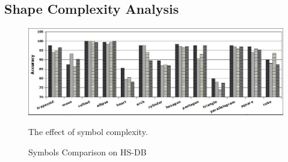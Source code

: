 \documentclass{article}
\begin{document}
\subsection{Shape Complexity Analysis}
\label{sec:ShapeComplexityExperiments}

\begin{figure}
	\centering
		\includegraphics[scale=0.5]{images/testsym.jpg}
	\caption{Symbols Comparison on HS-DB} The effect of symbol complexity.  %
	\label{fig:test2}
\end{figure}  
\end{document}
